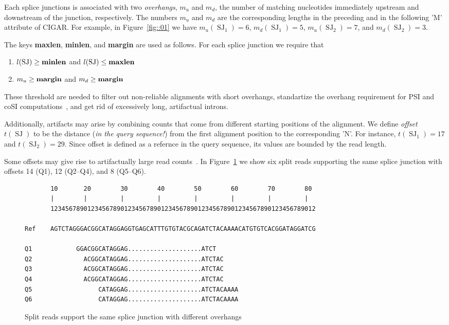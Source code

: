 \documentclass{article}
\DeclareMathOperator{\SJ}{SJ}
\begin{document}
Each splice junctions is associated with two {\em overhangs}, $m_u$ and $m_d$, the number of matching 
nucleotides immediately upstream and downstream of the junction, respectively. The numbers $m_u$ and $m_d$ 
are the corresponding lengths in the preceding and in the following 'M' attribute of CIGAR. For example, in
Figure~\ref{fig::01} we have $m_u(\SJ_1)=6$, $m_d(\SJ_1)=5$, $m_u(\SJ_2)=7$, and $m_d(\SJ_2)=3$.


The keys {\bf maxlen}, {\bf minlen}, and {\bf margin} are used as follows. For each splice junction we 
require that
\begin{enumerate}
\item $l(\SJ)\ge \rm\bf minlen$ and $l(\SJ)\le \rm\bf maxlen$
\item $m_u\ge \rm\bf margin$ and $m_d\ge \rm\bf margin$
\end{enumerate}
These threshold are needed to filter out non-reliable alignments with short overhangs, standartize the 
overhang requirement for PSI and coSI computations~\cite{pmid23172860, pmid22955974}, and get rid of 
excessively long, artifactual introns.

Additionally, artifacts may arise by combining counts that come from different starting positions of the 
alignment. We define {\em offset} $t(\SJ)$ to be the distance ({\em in the query sequence!}) from the first 
alignment position to the corresponding 'N'. For instance, $t(\SJ_1)=17$ and $t(\SJ_2) = 29$. Since offset
is defined as a refernce in the query sequence, its values are bounded by the read length.

Some offsets may give rise to artifactually large
read counts~\cite{pmid22537040}. In Figure~\ref{fig::02} we show six split reads supporting the same 
splice junction with offsets 14 (Q1), 12 (Q2--Q4), and 8 (Q5--Q6).
%
\begin{figure}[h]
\footnotesize
\begin{verbatim}
       10       20        30        40        50        60        70        80
       |        |         |         |         |         |         |         |
       123456789012345678901234567890123456789012345678901234567890123456789012

Ref    AGTCTAGGGACGGCATAGGAGGTGAGCATTTGTGTACGCAGATCTACAAAACATGTGTCACGGATAGGATCG

Q1            GGACGGCATAGGAG....................ATCT      
Q2              ACGGCATAGGAG....................ATCTAC    
Q3              ACGGCATAGGAG....................ATCTAC    
Q4              ACGGCATAGGAG....................ATCTAC    
Q5                  CATAGGAG....................ATCTACAAAA
Q6                  CATAGGAG....................ATCTACAAAA
\end{verbatim}
\caption{Split reads support the same splice junction with different overhangs\label{fig::02}}
\end{figure}
\end{document}

